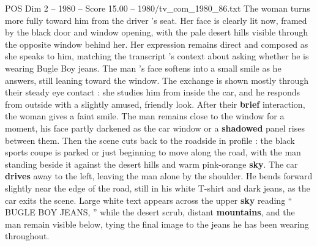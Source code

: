 \begin{textsample}{POS Dim 2 – 1980 – Score 15.00 – 1980/tv\_com\_1980\_86.txt}
The woman turns more fully toward him from the driver ’s seat.
Her face is clearly lit now, framed by the black door and window opening, with the pale desert hills visible through the opposite window behind her.
Her expression remains direct and composed as she speaks to him, matching the transcript ’s context about asking whether he is wearing Bugle Boy jeans.
The man ’s face softens into a small smile as he answers, still leaning toward the window.
The exchange is shown mostly through their steady eye contact : she studies him from inside the car, and he responds from outside with a slightly amused, friendly look.
After their \textbf{brief} interaction, the woman gives a faint smile.
The man remains close to the window for a moment, his face partly darkened as the car window or a \textbf{shadowed} panel rises between them.
Then the scene cuts back to the roadside in profile : the black sports coupe is parked or just beginning to move along the road, with the man standing beside it against the desert hills and warm pink-orange \textbf{sky}.
The car \textbf{drives} away to the left, leaving the man alone by the shoulder.
He bends forward slightly near the edge of the road, still in his white T-shirt and dark jeans, as the car exits the scene.
Large white text appears across the upper \textbf{sky} reading “ BUGLE BOY JEANS, ” while the desert scrub, distant \textbf{mountains}, and the man remain visible below, tying the final image to the jeans he has been wearing throughout.

\end{textsample}
